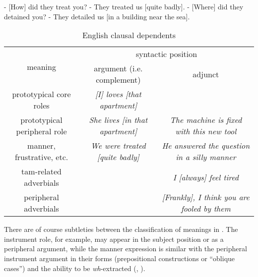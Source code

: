 \documentclass[UTF8, a4paper, oneside, scheme=plain]{ctexrep}
\newcommand{\corpus}[1]{\emph{#1}}
\begin{document}
\begin{exe}
    \ex\label{ex:simple-clause.dependents.ex-1} - [How] did they treat you? - They treated us [quite badly].
    \ex\label{ex:simple-clause.dependents.ex-2} - [Where] did they detained you? - They detailed us [in a building near the sea].
\end{exe}

\begin{table}[H]
    \caption{English clausal dependents}
    \label{tbl:clausal-dependent}
    \begin{tabular}{ccc}
    \toprule
    \multirow{2}{*}{meaning}      & \multicolumn{2}{c}{syntactic position}                                                       \\ \cmidrule{2-3}
                                  & argument (i.e. complement)                             & adjunct                                             \\ \midrule
    prototypical core roles       & \cellcolor[HTML]{32CB00}\corpus{[I] loves [that apartment]}             & \\ 
    prototypical peripheral role  & \cellcolor[HTML]{34FF34}\corpus{She lives [in that apartment]} & \cellcolor[HTML]{34CDF9}\corpus{The machine is fixed with this new tool}    \\
    manner, frustrative, etc.     & \cellcolor[HTML]{DAE8FC}\cellcolor[HTML]{67FD9A}\corpus{We were treated [quite badly]} & \cellcolor[HTML]{DAE8FC}\corpus{He answered the question in a silly manner} \\
    \acs{tam}-related adverbials &                                        & \cellcolor[HTML]{ECF4FF}\corpus{I [always] feel tired}                      \\
    peripheral adverbials  &                                        & \corpus{[Frankly], I think you are fooled by them} \\ \bottomrule
    \end{tabular}
\end{table}

There are of course subtleties between the classification of meanings in .
The instrument role, for example, 
may appear in the subject position or as a peripheral argument, 
while the manner expression is similar with the peripheral instrument argument 
in their forms (prepositional constructions or ``oblique cases'')
and the ability to be \corpus{wh}-extracted
(, ).
\end{document}
